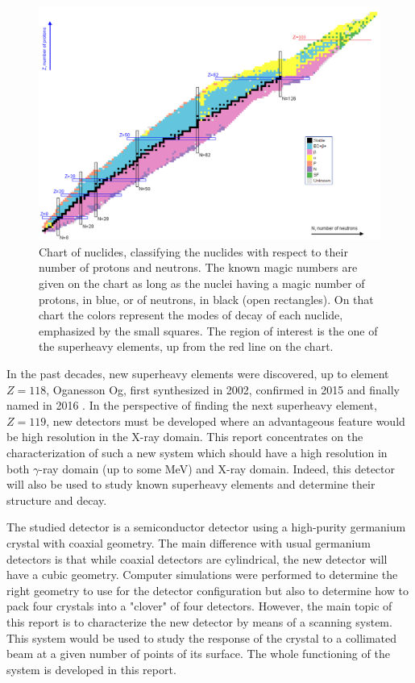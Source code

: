 \documentclass[11pt,a4paper]{article}
\begin{document}
\begin{figure}[!h]
\centering
\includegraphics[scale=0.6]{Nuclchart2.png}
\caption{Chart of nuclides, classifying the nuclides with respect to their number of protons and neutrons. The known magic numbers are given on the chart as long as the nuclei having a magic number of protons, in blue, or of neutrons, in black (open rectangles). On that chart the colors represent the modes of decay of each nuclide, emphasized by the small squares. The region of interest is the one of the superheavy elements, up from the red line on the chart.}
\label{Nuclchart}
\end{figure}

In the past decades, new superheavy elements were discovered, up to element $Z = 118$, Oganesson Og, first synthesized in 2002, confirmed in 2015 and finally named in 2016 \cite{element118}.
In the perspective of finding the next superheavy element, $Z = 119$, new detectors must be developed where an advantageous feature would be high resolution in the X-ray domain. This report concentrates on the characterization of such a new system which should have a high resolution in both $\gamma$-ray domain (up to some MeV) and X-ray domain. Indeed, this detector will also be used to study known superheavy elements and determine their structure and decay.

The studied detector is a semiconductor detector using a high-purity germanium crystal with coaxial geometry. The main difference with usual germanium detectors is that while coaxial detectors are cylindrical, the new detector will have a cubic geometry. Computer simulations were performed to determine the right geometry to use for the detector configuration but also to determine how to pack four crystals into a "clover" of four detectors. However, the main topic of this report is to characterize the new detector by means of a scanning system. This system would be used to study the response of the crystal to a collimated beam at a given number of points of its surface. The whole functioning of the system is developed in this report.
\end{document}
